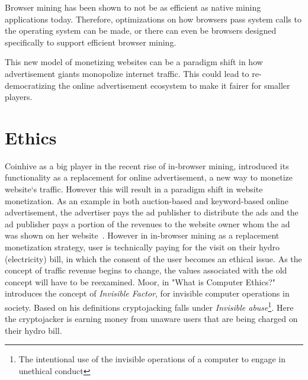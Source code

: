 Browser mining has been shown to not be as efficient as native mining applications today. Therefore, optimizations on how browsers pass system calls to the operating system can be made, or there can even be browsers designed specifically to support efficient browser mining.

This new model of monetizing websites can be a paradigm shift in how advertisement giants monopolize internet traffic. This could lead to re-democratizing the online advertisement ecosystem to make it fairer for smaller players.




\section{Ethics}
Coinhive as a big player in the recent rise of in-browser mining, introduced its functionality as a replacement for online advertisement, a new way to monetize website`s traffic. However this will result in a paradigm shift in website monetization. As an example in both auction-based and keyword-based online advertisement, the advertiser pays the ad publisher to distribute the ads and the ad publisher pays a portion of the revenues to the website owner whom the ad was shown on her website~\cite{king2007internet}. However in in-browser mining as a replacement monetization strategy, user is technically paying for the visit on their hydro (electricity) bill, in which the consent of the user becomes an ethical issue. As the concept of traffic revenue begins to change, the values associated with the old concept will have to be reexamined. Moor, in "What is Computer Ethics?" ~\cite{moor1985computer} introduces the concept of \textit{Invisible Factor}, for invisible computer operations in society. Based on his definitions cryptojacking falls under \textit{Invisible abuse}\footnote{The intentional use of the invisible operations of a computer to engage in unethical conduct}. Here the cryptojacker is earning money from unaware users that are being charged on their hydro bill. 



















